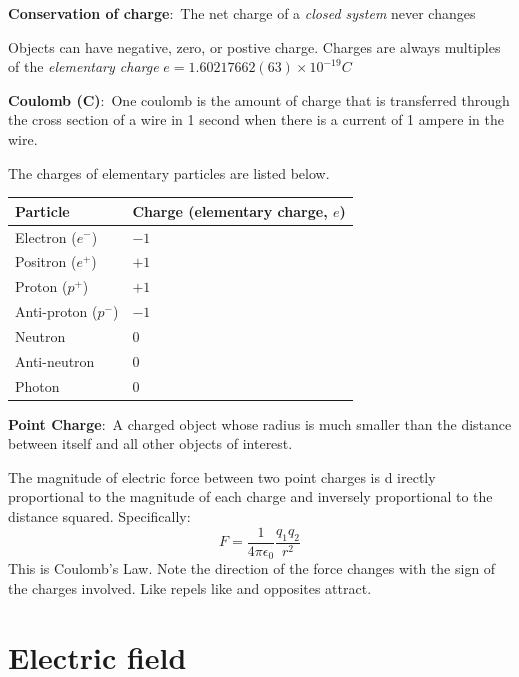 \documentclass[nobib]{tufte-handout}
\newcommand{\defn}[2]{\noindent\textbf{#1}:\ #2}
\begin{document}
\defn{Conservation of charge}{The net charge of a \emph{closed system} never changes}

Objects can have negative, zero, or postive charge. 
Charges are always multiples of the \emph{elementary charge} $e = 1.60217662(63) \times 10^{-19} C$

\defn{Coulomb (C)}{One coulomb is the amount of charge that is
transferred through the cross section of a wire in 1 second
when there is a current of 1 ampere in the wire.}

The charges of elementary particles are listed below.
\begin{table}[ht]
    \centering
    \begin{tabular}{@{}ll@{}}
    \toprule
    Particle & Charge (elementary charge, $e$) \\
    \midrule
    Electron ($e^-$) & $-1$ \\
    Positron ($e^+$) & $+1$ \\
    Proton ($p^+$) & $+1$ \\
    Anti-proton ($p^-$) & $-1$ \\
    Neutron& $0$ \\
    Anti-neutron & $0$ \\
    Photon& $0$ \\
    \bottomrule
    \end{tabular}
    \end{table}

\defn{Point Charge}{A charged object whose
radius is much smaller than the distance
between itself and all other objects of
interest.}

The magnitude of electric force between two point charges is d
irectly proportional to the magnitude of each charge and 
inversely proportional to the distance squared. Specifically:
\[F = \frac{1}{4\pi \epsilon_0}\frac{q_1 q_2}{r^2}\]
This is Coulomb's Law. Note the direction of the force changes
with the sign of the charges involved. Like repels like and opposites
attract. 

\section{Electric field}
\end{document}
